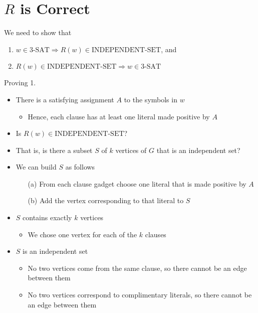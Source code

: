 \documentclass[a4paper]{report}
\newcommand{\bookref}[3]{\marginpar{\faBook{}~#1\\Chapter #2\\Section #3}}
\theoremstyle{definition}
\begin{document}
\section{$R$ is Correct}
\bookref{ER}{28}{28.4}
We need to show that
\begin{enumerate}
\item $w \in \text{3-SAT} \Rightarrow R(w) \in \text{INDEPENDENT-SET}$, and
\item $R(w) \in \text{INDEPENDENT-SET} \Rightarrow w \in \text{3-SAT}$
\end{enumerate}

Proving 1.
\begin{itemize}
\item There is a satisfying assignment $A$ to the symbols in $w$
\begin{itemize}
\item Hence, each clause has at least one literal made positive by $A$
\end{itemize}
\item Is $R(w) \in \text{INDEPENDENT-SET}$?\
\item That is, is there a subset $S$ of $k$ vertices of $G$ that is an independent set?
\item We can build $S$ as follows
\begin{itemize}
\item[(a)] From each clause gadget choose one literal that is made positive by $A$
\item[(b)] Add the vertex corresponding to that literal to $S$
\end{itemize}
\item $S$ contains exactly $k$ vertices
\begin{itemize}
\item We chose one vertex for each of the $k$ clauses
\end{itemize}
\item $S$ is an independent set
\begin{itemize}
\item No two vertices come from the same clause, so there cannot be an edge between them
\item No two vertices correspond to complimentary literals, so there cannot be an edge between them
\end{itemize}
\end{itemize}
\end{document}

